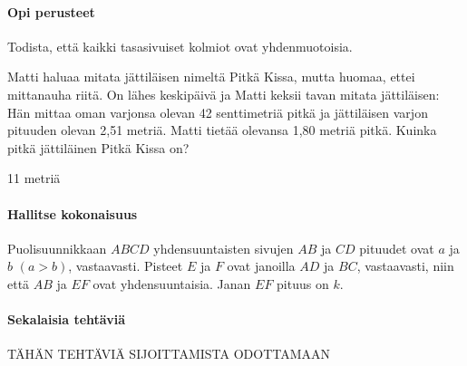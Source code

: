 \begin{tehtavasivu}

\paragraph*{Opi perusteet}

\begin{tehtava}
Todista, että kaikki tasasivuiset kolmiot ovat yhdenmuotoisia.
\end{tehtava}

\begin{tehtava}
Matti haluaa mitata jättiläisen nimeltä Pitkä Kissa, mutta huomaa, ettei mittanauha riitä. On lähes keskipäivä ja Matti keksii tavan mitata jättiläisen: Hän mittaa oman varjonsa olevan 42 senttimetriä pitkä ja jättiläisen varjon pituuden olevan 2,51 metriä. Matti tietää olevansa 1,80 metriä pitkä. Kuinka pitkä jättiläinen Pitkä Kissa on?

\begin{vastaus}
11 metriä
\end{vastaus}
\end{tehtava}

\paragraph*{Hallitse kokonaisuus}
\begin{tehtava}
Puolisuunnikkaan $ABCD$ yhdensuuntaisten sivujen $AB$ ja $CD$ pituudet ovat $a$ ja $b$ $(a > b)$, vastaavasti. Pisteet $E$ ja $F$ ovat janoilla $AD$ ja $BC$, vastaavasti, niin että $AB$ ja $EF$ ovat yhdensuuntaisia. Janan $EF$ pituus on $k$.

\begin{alakohdat}
\end{alakohdat}

\begin{vastaus}\begin{alakohdat}
\end{alakohdat}
\end{vastaus}


\end{tehtava}
\paragraph*{Sekalaisia tehtäviä}

TÄHÄN TEHTÄVIÄ SIJOITTAMISTA ODOTTAMAAN


\end{tehtavasivu}



